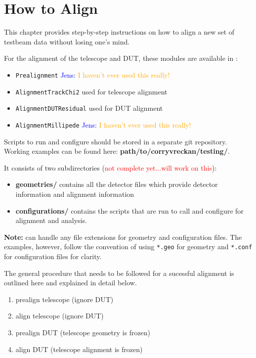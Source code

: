 \chapter{How to Align}
\label{ch:howtoalign}

This chapter provides step-by-step instructions on how to align a new set of testbeam data without losing one's mind.

For the alignment of the telescope and DUT, these modules are available in \corry:
\begin{itemize}
\item \texttt{Prealignment} \textcolor{blue}{Jens: }\textcolor{orange}{I haven't ever used this really!}
\item \texttt{AlignmentTrackChi2} used for telescope alignment
\item \texttt{AlignmentDUTResidual} used for DUT alignment
\item \texttt{AlignmentMillipede} \textcolor{blue}{Jens: }\textcolor{orange}{I haven't ever used this really!}
\end{itemize}

Scripts to run and configure \corry should be stored in a separate git repository.
Working examples can be found here: \textbf{path/to/corryvreckan/testing/}.

It consists of two subdirectories (\textcolor{red}{not complete yet...will work on this}):
\begin{itemize}
\item \textbf{geometries/} contains all the detector files which provide detector information and alignment information
\item \textbf{configurations/} contains the scripts that are run to call and configure \corry for alignment and analysis.
\end{itemize}

\textbf{Note:} \corry can handle any file extensions for geometry and configuration files. The examples, however, follow the convention of using \texttt{*.geo} for geometry and \texttt{*.conf} for configuration files for clarity.

The general procedure that needs to be followed for a sucessful alignment is outlined here and explained in detail below.
\begin{enumerate}
\item prealign telescope (ignore DUT)
\item align telescope (ignore DUT)
\item prealign DUT (telescope geometry is frozen)
\item align DUT (telescope alignment is frozen)
\end{enumerate}

